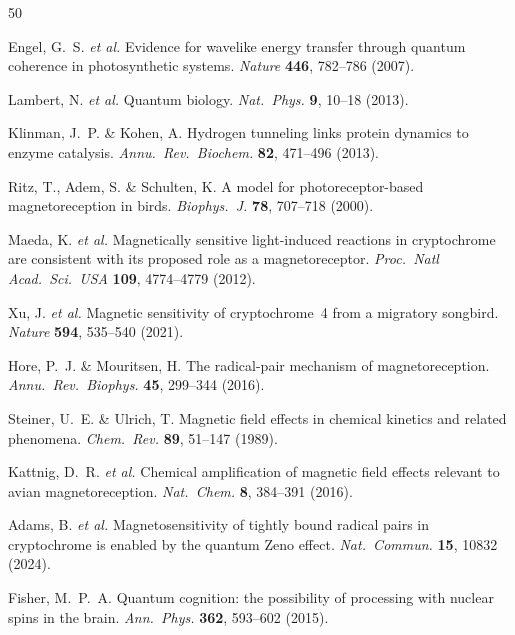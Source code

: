 \documentclass[11pt]{article}
\begin{document}

\begin{thebibliography}{50}

\label{ref:Engel2007} Engel, G.~S. \textit{et al.} Evidence for wavelike energy transfer through quantum coherence in photosynthetic systems. \textit{Nature} \textbf{446}, 782--786 (2007).

\label{ref:Lambert2013} Lambert, N. \textit{et al.} Quantum biology. \textit{Nat.\ Phys.} \textbf{9}, 10--18 (2013).

\label{ref:Klinman2013} Klinman, J.~P. \& Kohen, A. Hydrogen tunneling links protein dynamics to enzyme catalysis. \textit{Annu.\ Rev.\ Biochem.} \textbf{82}, 471--496 (2013).

\label{ref:Ritz2000} Ritz, T., Adem, S. \& Schulten, K. A model for photoreceptor-based magnetoreception in birds. \textit{Biophys.\ J.} \textbf{78}, 707--718 (2000).

\label{ref:Maeda2012} Maeda, K. \textit{et al.} Magnetically sensitive light-induced reactions in cryptochrome are consistent with its proposed role as a magnetoreceptor. \textit{Proc.\ Natl Acad.\ Sci.\ USA} \textbf{109}, 4774--4779 (2012).

\label{ref:Xu2021} Xu, J. \textit{et al.} Magnetic sensitivity of cryptochrome~4 from a migratory songbird. \textit{Nature} \textbf{594}, 535--540 (2021).

\label{ref:Hore2016} Hore, P.~J. \& Mouritsen, H. The radical-pair mechanism of magnetoreception. \textit{Annu.\ Rev.\ Biophys.} \textbf{45}, 299--344 (2016).

\label{ref:Steiner1989} Steiner, U.~E. \& Ulrich, T. Magnetic field effects in chemical kinetics and related phenomena. \textit{Chem.\ Rev.} \textbf{89}, 51--147 (1989).

\label{ref:Kattnig2016} Kattnig, D.~R. \textit{et al.} Chemical amplification of magnetic field effects relevant to avian magnetoreception. \textit{Nat.\ Chem.} \textbf{8}, 384--391 (2016).

\label{ref:Kattnig2024} Adams, B. \textit{et al.} Magnetosensitivity of tightly bound radical pairs in cryptochrome is enabled by the quantum Zeno effect. \textit{Nat.\ Commun.} \textbf{15}, 10832 (2024).

\label{ref:Fisher2015} Fisher, M.~P.~A. Quantum cognition: the possibility of processing with nuclear spins in the brain. \textit{Ann.\ Phys.} \textbf{362}, 593--602 (2015).


\end{thebibliography}
\end{document}
